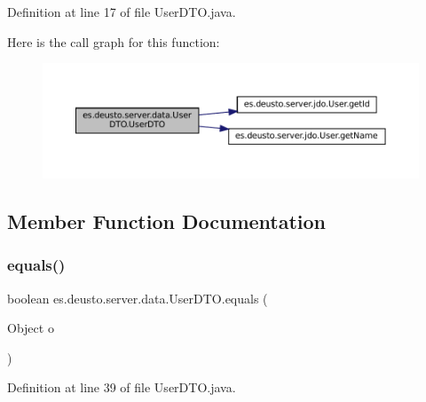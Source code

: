Definition at line 17 of file User\+D\+T\+O.\+java.

Here is the call graph for this function\+:
\nopagebreak
\begin{figure}[H]
\begin{center}
\leavevmode
\includegraphics[width=350pt]{classes_1_1deusto_1_1server_1_1data_1_1_user_d_t_o_ab05044a5b24bdbdcc1bbe582b7268b71_cgraph}
\end{center}
\end{figure}


\subsection{Member Function Documentation}
\mbox{\label{classes_1_1deusto_1_1server_1_1data_1_1_user_d_t_o_a2963ea7c4e6ae150e958abc1f0ce2bbb}} 
\subsubsection{\texorpdfstring{equals()}{equals()}}
{\footnotesize\ttfamily boolean es.\+deusto.\+server.\+data.\+User\+D\+T\+O.\+equals (\begin{DoxyParamCaption}\item[{Object}]{o }\end{DoxyParamCaption})}



Definition at line 39 of file User\+D\+T\+O.\+java.

